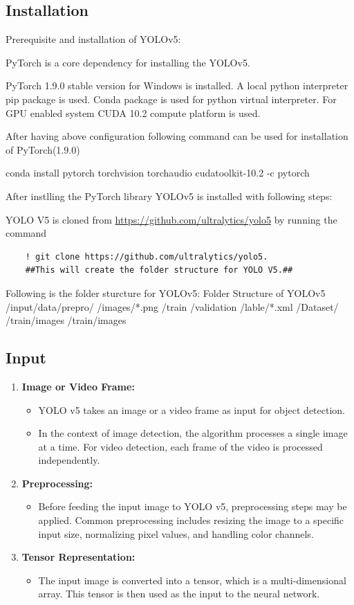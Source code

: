 \subsection{Installation}
Prerequisite and installation of YOLOv5:

PyTorch is a core dependency for installing the YOLOv5. 

PyTorch 1.9.0 stable version for Windows is installed. A local python interpreter pip package is used. Conda package is used for python virtual interpreter. For GPU enabled system CUDA 10.2 compute platform is used.

After having above configuration following command can be used for installation of PyTorch(1.9.0)

conda install pytorch torchvision torchaudio cudatoolkit-10.2 -c pytorch

After instlling the PyTorch library YOLOv5 is installed with following steps:

YOLO V5 is cloned from \url{https://github.com/ultralytics/yolo5} by running the command

\begin{lstlisting}
	! git clone https://github.com/ultralytics/yolo5. 
	##This will create the folder structure for YOLO V5.##
\end{lstlisting}

Following is the folder sturcture for YOLOv5:
Folder Structure of YOLOv5
/input/data/prepro/
/images/*.png
/train
/validation
/lable/*.xml
/Dataset/
/train/images
/train/images

\subsection{Input}
\begin{enumerate}
	\item \textbf{Image or Video Frame:}
	\begin{itemize}
		\item YOLO v5 takes an image or a video frame as input for object detection.
		\item In the context of image detection, the algorithm processes a single image at a time. For video detection, each frame of the video is processed independently.
	\end{itemize}
	\item \textbf{Preprocessing:}
	\begin{itemize}
		\item Before feeding the input image to YOLO v5, preprocessing steps may be applied. Common preprocessing includes resizing the image to a specific input size, normalizing pixel values, and handling color channels.
	\end{itemize}
	\item \textbf{Tensor Representation:}
	\begin{itemize}
		\item The input image is converted into a tensor, which is a multi-dimensional array. This tensor is then used as the input to the neural network.
	\end{itemize}
\end{enumerate}

